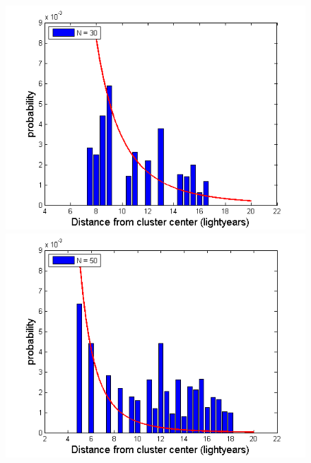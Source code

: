 \begin{figure}[H]
\centering
\begin{minipage}{.5\textwidth}
  \centering
  \includegraphics[width=1\linewidth]{Figures/N30.png}
\end{minipage}%
\begin{minipage}{.5\textwidth}
  \centering
  \includegraphics[width=1\linewidth]{Figures/N50.png}
\end{minipage}
\begin{minipage}{.5\textwidth}
  \centering

\end{minipage}
\end{figure}
